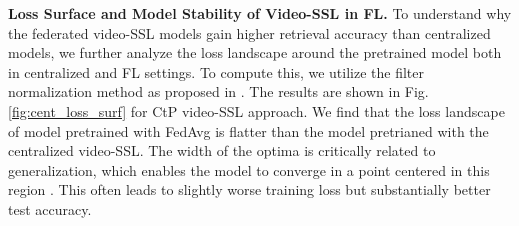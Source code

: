 \setlength{\tabcolsep}{1.7pt}
\begin{table}[t]
\begin{center}
    \caption{\small Video clip retrieval accuracies (\%) and fine-tuning accuracies (\%) on UCF and HMDB for CtP video-SSL approach using various aggregation strategies. The SSL pretraining is performed on K400 (Non-IID).
    Cent represents the centralized training for  epochs which equals to  rounds in our FL setting } 
    \label{Tab-action_finetune_adam}
\end{center}
\end{table}


\noindent \textbf{Loss Surface and Model Stability of Video-SSL in FL.}
To understand why the federated video-SSL models gain higher retrieval accuracy than centralized models, we further analyze the loss landscape around the pretrained model both in centralized and FL settings. To compute this, we utilize the filter normalization method as proposed in \cite{li2018visualizing}. The results are shown in Fig. \ref{fig:cent_loss_surf} for CtP video-SSL approach. We find that the loss landscape of model pretrained with FedAvg is flatter than the model pretrianed with the centralized video-SSL. 
The width of the optima is critically related to generalization, which enables the model to converge in a point centered in this region \cite{izmailov2018averaging,keskar2016large,hochreiter1997flat}. This often leads to slightly worse training loss but substantially better test accuracy.


